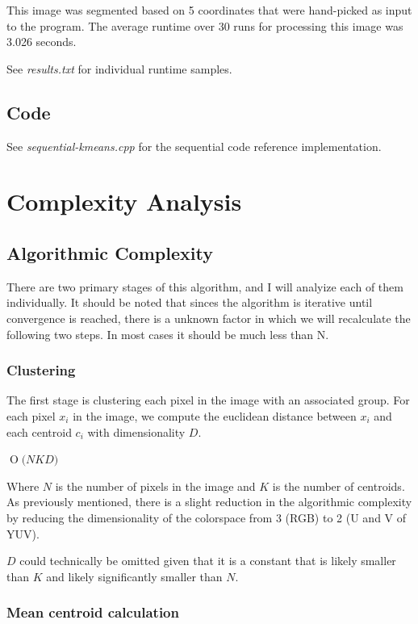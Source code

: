 \documentclass[11pt]{article}
\newcommand{\BigO}[1]{\ensuremath{\operatorname{O}\bigl(#1\bigr)}}
\begin{document}
This image was segmented based on 5 coordinates that were hand-picked as input to the program.
The average runtime over 30 runs for processing this image was 3.026 seconds.

See \emph{results.txt} for individual runtime samples.

\subsection{Code}

See \emph{sequential-kmeans.cpp} for the sequential code reference implementation.

\section{Complexity Analysis}

\subsection{Algorithmic Complexity}

There are two primary stages of this algorithm, and I will analyize each of them individually.
It should be noted that sinces the algorithm is iterative until convergence is reached, there
is a unknown factor in which we will recalculate the following two steps. In most cases it
should be much less than N.

\subsubsection{Clustering}

The first stage is clustering each pixel in the image with an associated group. For
each pixel $x_i$ in the image, we compute the euclidean distance between $x_i$
and each centroid $c_i$ with dimensionality $D$.

$\BigO{NKD}$

Where $N$ is the number of pixels in the image and $K$ is the number of centroids. As
previously mentioned, there is a slight reduction in the algorithmic complexity by
reducing the dimensionality of the colorspace from 3 (RGB) to 2 (U and V of YUV).

$D$ could technically be omitted given that it is a constant that is likely smaller
than $K$ and likely significantly smaller than $N$.

\subsubsection{Mean centroid calculation}
\end{document}
